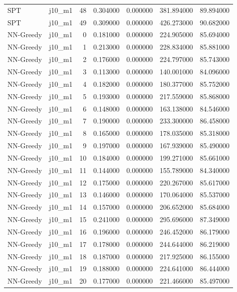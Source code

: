 \begin{tabular}{llrrrrr}
SPT & j10_m1 & 48 & 0.304000 & 0.000000 & 381.894000 & 89.894000 \\
SPT & j10_m1 & 49 & 0.309000 & 0.000000 & 426.273000 & 90.682000 \\
NN-Greedy & j10_m1 & 0 & 0.181000 & 0.000000 & 224.905000 & 85.694000 \\
NN-Greedy & j10_m1 & 1 & 0.213000 & 0.000000 & 228.834000 & 85.881000 \\
NN-Greedy & j10_m1 & 2 & 0.176000 & 0.000000 & 224.797000 & 85.743000 \\
NN-Greedy & j10_m1 & 3 & 0.113000 & 0.000000 & 140.001000 & 84.096000 \\
NN-Greedy & j10_m1 & 4 & 0.182000 & 0.000000 & 180.377000 & 85.752000 \\
NN-Greedy & j10_m1 & 5 & 0.193000 & 0.000000 & 217.559000 & 85.868000 \\
NN-Greedy & j10_m1 & 6 & 0.148000 & 0.000000 & 163.138000 & 84.546000 \\
NN-Greedy & j10_m1 & 7 & 0.190000 & 0.000000 & 233.300000 & 86.458000 \\
NN-Greedy & j10_m1 & 8 & 0.165000 & 0.000000 & 178.035000 & 85.318000 \\
NN-Greedy & j10_m1 & 9 & 0.197000 & 0.000000 & 167.939000 & 85.490000 \\
NN-Greedy & j10_m1 & 10 & 0.184000 & 0.000000 & 199.271000 & 85.661000 \\
NN-Greedy & j10_m1 & 11 & 0.144000 & 0.000000 & 155.789000 & 84.340000 \\
NN-Greedy & j10_m1 & 12 & 0.175000 & 0.000000 & 220.267000 & 85.617000 \\
NN-Greedy & j10_m1 & 13 & 0.146000 & 0.000000 & 170.064000 & 85.537000 \\
NN-Greedy & j10_m1 & 14 & 0.157000 & 0.000000 & 206.652000 & 85.684000 \\
NN-Greedy & j10_m1 & 15 & 0.241000 & 0.000000 & 295.696000 & 87.349000 \\
NN-Greedy & j10_m1 & 16 & 0.196000 & 0.000000 & 246.452000 & 86.179000 \\
NN-Greedy & j10_m1 & 17 & 0.178000 & 0.000000 & 244.644000 & 86.219000 \\
NN-Greedy & j10_m1 & 18 & 0.187000 & 0.000000 & 217.925000 & 86.155000 \\
NN-Greedy & j10_m1 & 19 & 0.188000 & 0.000000 & 224.641000 & 86.444000 \\
NN-Greedy & j10_m1 & 20 & 0.177000 & 0.000000 & 221.466000 & 85.497000 \\

\end{tabular}
